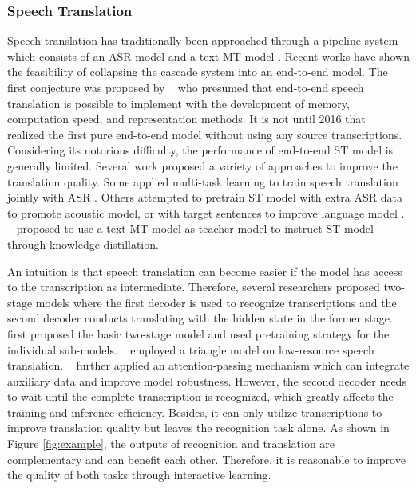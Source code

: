 \documentclass[letterpaper]{article} %
\begin{document}
\subsubsection{Speech Translation} Speech translation has traditionally been approached through a pipeline system which consists of an ASR model and a text MT model \cite{sutskever2014sequence,Bahdanau:2015,chan2016listen,chiu2017state,vaswani2017attention}. 
Recent works have shown the feasibility of collapsing the cascade system into an end-to-end model. %
The first conjecture was proposed by \citeauthor{1999The}~ who presumed that end-to-end speech translation is possible to implement with the development of memory, computation speed, and representation methods.
It is not until 2016 that~\citeauthor{berard2016listen}~ realized the first pure end-to-end model without using any source transcriptions.
Considering its notorious difficulty, the performance of end-to-end ST model is generally limited. Several work proposed a variety of approaches to improve the translation quality. Some applied multi-task learning to train speech translation jointly with ASR \cite{weiss2017sequence,anastasopoulos2018leveraging,berard2018end}. Others attempted to pretrain ST model with extra ASR data to promote acoustic model, or with target sentences to improve language model \cite{bansal2018pre,jia2019leveraging}. \citeauthor{liu2019end}~ proposed to use a text MT model as teacher model to instruct ST model through knowledge distillation.

An intuition is that speech translation can become easier if the model has access to the transcription as intermediate. Therefore, several researchers proposed two-stage models where the first decoder is used to recognize transcriptions and the second decoder conducts translating with the hidden state in the former stage. 
\citeauthor{kano2017structured}~ first proposed the basic two-stage model and used pretraining strategy for the individual sub-models.  \citeauthor{anastasopoulos2018tied}~ employed a triangle model on low-resource speech translation. \citeauthor{sperber2019attention}~ further applied an attention-passing mechanism which can integrate auxiliary data and improve model robustness.
However, the second decoder needs to wait until the complete transcription is recognized, which greatly affects the training and inference efficiency. Besides, it can only utilize transcriptions to improve translation quality but leaves the recognition task alone. As shown in Figure \ref{fig:example}, the outputs of recognition and translation are complementary and can benefit each other. Therefore, it is reasonable to improve the quality of both tasks through interactive learning.
\end{document}
